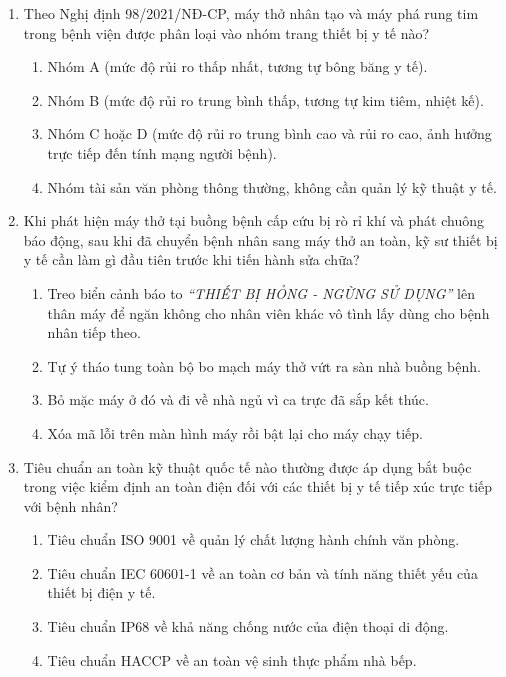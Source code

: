 \documentclass[12pt,a4paper]{article}
\begin{document}
\begin{enumerate}[label=\textbf{Câu \arabic*:}, leftmargin=*]
\item Theo Nghị định 98/2021/NĐ-CP, máy thở nhân tạo và máy phá rung tim trong bệnh viện được phân loại vào nhóm trang thiết bị y tế nào?
\begin{enumerate}[label=\textbf{\Alph*.}]
    \item Nhóm A (mức độ rủi ro thấp nhất, tương tự bông băng y tế).
    \item Nhóm B (mức độ rủi ro trung bình thấp, tương tự kim tiêm, nhiệt kế).
    \item Nhóm C hoặc D (mức độ rủi ro trung bình cao và rủi ro cao, ảnh hưởng trực tiếp đến tính mạng người bệnh).
    \item Nhóm tài sản văn phòng thông thường, không cần quản lý kỹ thuật y tế.
\end{enumerate}

\item Khi phát hiện máy thở tại buồng bệnh cấp cứu bị rò rỉ khí và phát chuông báo động, sau khi đã chuyển bệnh nhân sang máy thở an toàn, kỹ sư thiết bị y tế cần làm gì đầu tiên trước khi tiến hành sửa chữa?
\begin{enumerate}[label=\textbf{\Alph*.}]
    \item Treo biển cảnh báo to \textit{``THIẾT BỊ HỎNG - NGỪNG SỬ DỤNG''} lên thân máy để ngăn không cho nhân viên khác vô tình lấy dùng cho bệnh nhân tiếp theo.
    \item Tự ý tháo tung toàn bộ bo mạch máy thở vứt ra sàn nhà buồng bệnh.
    \item Bỏ mặc máy ở đó và đi về nhà ngủ vì ca trực đã sắp kết thúc.
    \item Xóa mã lỗi trên màn hình máy rồi bật lại cho máy chạy tiếp.
\end{enumerate}

\item Tiêu chuẩn an toàn kỹ thuật quốc tế nào thường được áp dụng bắt buộc trong việc kiểm định an toàn điện đối với các thiết bị y tế tiếp xúc trực tiếp với bệnh nhân?
\begin{enumerate}[label=\textbf{\Alph*.}]
    \item Tiêu chuẩn ISO 9001 về quản lý chất lượng hành chính văn phòng.
    \item Tiêu chuẩn IEC 60601-1 về an toàn cơ bản và tính năng thiết yếu của thiết bị điện y tế.
    \item Tiêu chuẩn IP68 về khả năng chống nước của điện thoại di động.
    \item Tiêu chuẩn HACCP về an toàn vệ sinh thực phẩm nhà bếp.
\end{enumerate}


\end{enumerate}
\end{document}
